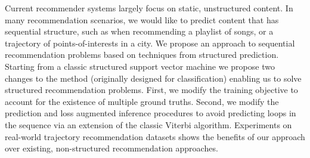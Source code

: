 
Current recommender systems largely focus on static, unstructured content.
In many recommendation scenarios, we would like to predict content that has sequential structure,
such as when recommending a playlist of songs, or a trajectory of points-of-interests in a city.
We propose an approach to sequential recommendation problems based
on techniques from structured prediction.
Starting from a classic structured support vector machine
we propose two changes to the method (originally designed for classification)
enabling us to solve structured recommendation problems.
First, we modify the training objective to account for the existence of multiple ground truths.
Second, we modify the prediction and loss augmented inference procedures to avoid predicting loops in the sequence via an extension of the classic Viterbi algorithm.
Experiments on real-world trajectory recommendation datasets shows the benefits of our approach over existing, non-structured recommendation approaches.
